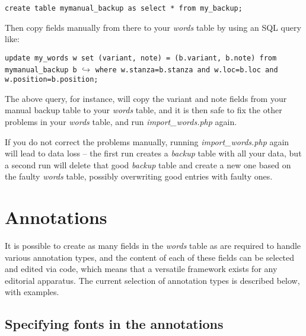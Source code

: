 \verb|create table mymanual_backup as select * from my_backup;|

Then copy fields manually from there to your \textit{words} table by using an SQL query like:

\verb|update my_words w set (variant, note) = (b.variant, b.note) from mymanual_backup b|
$\hookrightarrow$ \verb|where w.stanza=b.stanza and w.loc=b.loc and w.position=b.position;|

The above query, for instance, will copy the variant and note fields from your manual backup table to your \textit{words} table, and it is then safe to fix the other problems in your \textit{words} table, and run \textit{import_words.php} again.

If you do not correct the problems manually, running \textit{import_words.php} again will lead to data loss -- the first run creates a \textit{backup} table with all your data, but a second run will delete that good \textit{backup} table and create a new one based on the faulty \textit{words} table, possibly overwriting good entries with faulty ones. 


\section{Annotations}
\label{s:annotation}

It is possible to create as many fields in the \textit{words} table as are required to handle various annotation types, and the content of each of these fields can be selected and edited via code, which means that a versatile framework exists for any editorial apparatus.  The current selection of annotation types is described below, with examples.


\subsection{Specifying fonts in the annotations}

